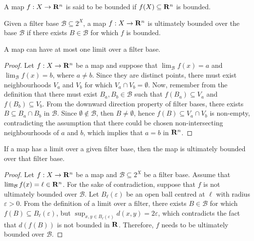 \begin{definition}[Bounded]\label{def: bounded-several}
    A map \(f: X \to \mathbf{R}^n\) is said to be bounded if \(f(X) \subseteq \mathbf{R}^n\) is
    bounded.
\end{definition}

\begin{definition}\label{def: ulti-bounded-several}
    Given a filter base \(\mathcal B \subseteq 2^X\), a map \(f: X \to \mathbf{R}^n\) is
    ultimately bounded over the base \(\mathcal B\) if there exists \(B \in
    \mathcal B\) for which \(f\) is bounded.
\end{definition}

\begin{proposition}
    A map can have at most one limit over a filter base.
\end{proposition}

\begin{proof}
    Let \(f: X \to \mathbf{R}^n\) be a map and suppose that \(\lim_\mathcal{B} f(x) = a\)
    and \(\lim_\mathcal{B} f(x) = b\), where \(a \neq b\). Since they are distinct
    points, there must exist neighbourhoods \(V_a\) and \(V_b\) for which \(V_a
    \cap V_b = \emptyset\). Now, remember from the definition that there must
    exist \(B_a, B_b \in \mathcal B\) such that \(f(B_a) \subseteq V_a\) and
    \(f(B_b) \subseteq V_b\). From the downward direction property of filter
    bases, there exists \(B \subseteq B_a \cap B_b\) in \(\mathcal B\). Since
    \(\emptyset \not\in \mathcal B\), then \(B \neq \emptyset\), hence \(f(B)
    \subseteq V_a \cap V_b\) is non-empty, contradicting the assumption that there
    could be chosen non-intersecting neighbourhoods of \(a\) and \(b\), which
    implies that \(a = b\) in \(\mathbf{R}^n\).
\end{proof}

\begin{proposition}
    If a map has a limit over a given filter base, then the map is ultimately
    bounded over that filter base.
\end{proposition}

\begin{proof}
    Let \(f: X \to \mathbf{R}^n\) be a map and \(\mathcal B \subseteq 2^X\) be a filter
    base. Assume that \(\lim_\mathcal{B} f(x) = \ell \in \mathbf{R}^n\). For the sake of
    contradiction, suppose that \(f\) is not ultimately bounded over \(\mathcal
    B\). Let \(B_\ell(\varepsilon)\) be an open ball centred at \(\ell\) with
    radius \(\varepsilon > 0\). From the definition of a limit over a filter,
    there exists \(B \in \mathcal B\) for which \(f(B) \subseteq
    B_\ell(\varepsilon)\), but \(\sup_{x, y \in B_\ell(\varepsilon)} d(x, y) = 2
    \varepsilon\), which contradicts the fact that \(d(f(B))\) is not bounded in
    \(\mathbf{R}\). Therefore, \(f\) needs to be ultimately bounded over \(\mathcal B\).
\end{proof}

